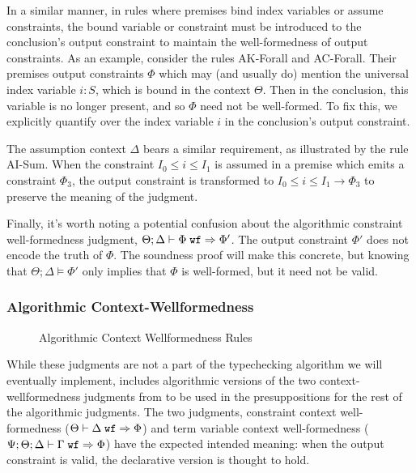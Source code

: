 In a similar manner, in rules where premises bind index variables or assume constraints, the bound variable or constraint must be introduced to the conclusion's output constraint to maintain the well-formedness of output constraints. As an example, consider the rules AK-Forall and AC-Forall. Their premises output constraints $\Phi$ which may (and usually do) mention the universal index variable $i : S$, which is bound in the context $\Theta$. Then in the conclusion, this variable is no longer present, and so $\Phi$ need not be well-formed. To fix this, we explicitly quantify over the index variable $i$ in the conclusion's output constraint. 

The assumption context $\Delta$ bears a similar requirement, as illustrated by the rule AI-Sum. When the constraint $I_0 \leq i \leq I_1$ is assumed in a premise which emits a constraint $\Phi_3$, the output constraint is transformed to $I_0 \leq i \leq I_1 \to \Phi_3$ to preserve the meaning of the judgment.

Finally, it's worth noting a potential confusion about the algorithmic constraint well-formedness judgment, $\Theta ; \Delta \vdash \Phi \; \texttt{wf} \Rightarrow \Phi'$.
The output constraint $\Phi'$ does not encode the truth of $\Phi$. The soundness proof will make this concrete, but knowing that $\Theta ; \Delta \vDash \Phi'$ only implies that $\Phi$ is well-formed, but it need not be valid.

\subsubsection{Algorithmic Context-Wellformedness}
\begin{figure}

\caption{Algorithmic Context Wellformedness Rules}
\label{fig:bilambdaamor-ctx-wf-rules}
\end{figure}

While these judgments are not a part of the typechecking algorithm we will eventually implement, \bilambdaamor includes algorithmic versions of the two context-wellformedness judgments from \dlambdaamor to be used in the presuppositions for the rest of the algorithmic judgments. The two judgments, constraint context well-formedness ($\Theta \vdash \Delta \; \texttt{wf} \Rightarrow \Phi$) and term variable context well-formedness ($\Psi ; \Theta ; \Delta \vdash \Gamma \; \texttt{wf} \Rightarrow \Phi$) have the expected intended meaning: when the output constraint is valid, the declarative version is thought to hold.

